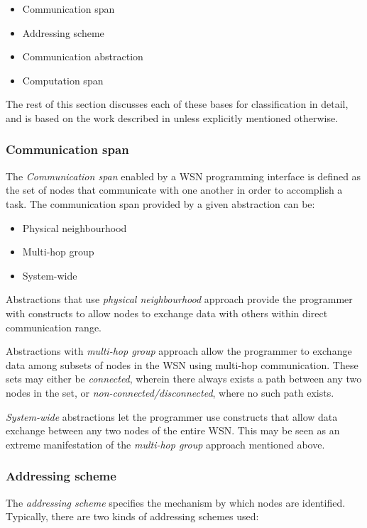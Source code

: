 \begin{itemize}
  \item Communication span
  \item Addressing scheme
  \item Communication abstraction
  \item Computation span
\end{itemize}

The rest of this section discusses each of these bases for classification in
detail, and is based on the work described in \cite{mottola_middleware:2008}
unless explicitly mentioned otherwise.

\subsubsection{Communication span}

The \emph{Communication span} enabled by a WSN programming interface is defined
as the set of nodes that communicate with one another in order to accomplish a
task. The communication span provided by a given abstraction can be:
\begin{itemize}
  \item Physical neighbourhood
  \item Multi-hop group
  \item System-wide
  
\end{itemize}
Abstractions that use \emph{physical neighbourhood} approach provide
  the programmer with constructs to allow nodes to exchange data with others
  within direct communication range.
  
Abstractions with \emph{multi-hop group} approach allow the
  programmer to exchange data among subsets of nodes in the WSN using
  multi-hop communication. These sets may either be
  \emph{connected}, wherein there always exists a path between any two nodes in
  the set, or \emph{non-connected/disconnected}, where no such path
  exists.

\emph{System-wide} abstractions let the
  programmer use constructs that allow data exchange between any two nodes
  of the entire WSN. This may be seen as an extreme manifestation of the
  \emph{multi-hop group} approach mentioned above.

\subsubsection{Addressing scheme}

The \emph{addressing scheme} specifies the mechanism by which nodes are
identified. Typically, there are two kinds of addressing schemes used:

